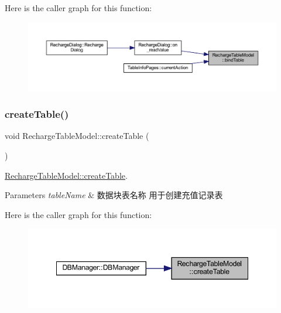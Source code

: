 Here is the caller graph for this function\+:
\nopagebreak
\begin{figure}[H]
\begin{center}
\leavevmode
\includegraphics[width=350pt]{class_recharge_table_model_a0747bbbc51e5061dad46178edfae4d85_icgraph}
\end{center}
\end{figure}
\mbox{\label{class_recharge_table_model_abf3ad9d708cfff7bbbc94e247b0bb508}} 
\subsubsection{\texorpdfstring{createTable()}{createTable()}}
{\footnotesize\ttfamily void Recharge\+Table\+Model\+::create\+Table (\begin{DoxyParamCaption}{ }\end{DoxyParamCaption})}



\mbox{\hyperlink{class_recharge_table_model_abf3ad9d708cfff7bbbc94e247b0bb508}{Recharge\+Table\+Model\+::create\+Table}}. 


\begin{DoxyParams}{Parameters}
{\em table\+Name} & 数据块表名称 用于创建充值记录表 \\
\hline
\end{DoxyParams}
Here is the caller graph for this function\+:
\nopagebreak
\begin{figure}[H]
\begin{center}
\leavevmode
\includegraphics[width=348pt]{class_recharge_table_model_abf3ad9d708cfff7bbbc94e247b0bb508_icgraph}
\end{center}
\end{figure}
\mbox{\label{class_recharge_table_model_a184459df461ce60d8f8d1874a23ff3d8}} 
